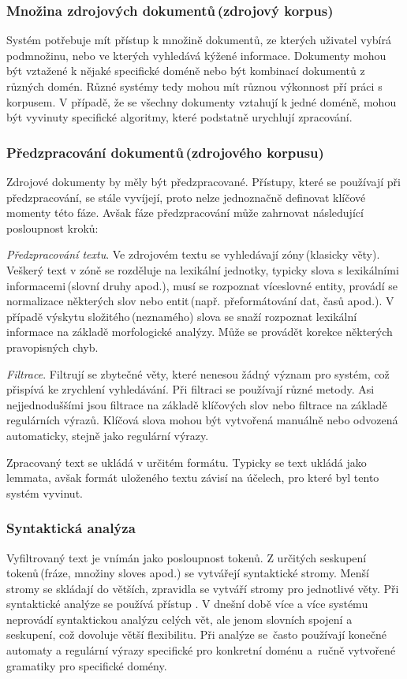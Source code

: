 \subsubsection*{Množina zdrojových dokumentů\,(zdrojový korpus)}
Systém potřebuje mít přístup k množině dokumentů, ze kterých uživatel vybírá podmnožinu, nebo ve kterých vyhledává kýžené informace. Dokumenty mohou být vztažené k nějaké specifické doméně nebo být kombinací dokumentů z různých domén.  Různé systémy tedy mohou mít různou výkonnost pří práci s korpusem. V případě, že se všechny dokumenty vztahují k jedné doméně, mohou být vyvinuty specifické algoritmy, které podstatně urychlují zpracování.  

\subsubsection*{Předzpracování dokumentů\,(zdrojového korpusu)}
Zdrojové dokumenty by měly být předzpracované. Přístupy, které se používají při předzpracování, se stále vyvíjejí, proto nelze jednoznačně definovat klíčové momenty této fáze. Avšak fáze předzpracování může zahrnovat následující posloupnost kroků:


\emph{Předzpracování textu}. Ve zdrojovém textu se vyhledávají zóny\,(klasicky věty). Veškerý text v zóně se rozděluje na lexikální jednotky, typicky slova s lexikálními informacemi\,(slovní druhy apod.),  musí se rozpoznat víceslovné entity, provádí se normalizace některých slov nebo entit\,(např. přeformátování dat, časů apod.). V případě výskytu složitého\,(neznamého) slova se snaží rozpoznat lexikální informace na základě morfologické analýzy. Může se provádět korekce některých pravopisných chyb. 

\emph{Filtrace}. Filtrují se zbytečné věty, které nenesou žádný význam pro systém, což přispívá ke zrychlení vyhledávání. Při filtraci se používají různé metody. Asi nejjednoduššími jsou filtrace na základě klíčových slov nebo filtrace na základě regulárních výrazů. Klíčová slova mohou být vytvořená manuálně nebo odvozená automaticky, stejně jako regulární výrazy.

Zpracovaný text se ukládá v určitém formátu. Typicky se text ukládá jako lemmata, avšak  formát uloženého textu závisí na účelech, pro které byl tento systém vyvinut.


\subsubsection{Syntaktická analýza}
Vyfiltrovaný text je vnímán jako posloupnost tokenů. Z určitých seskupení tokenů\,(fráze, množiny sloves apod.) se vytvářejí syntaktické stromy. Menší stromy se skládají do větších, zpravidla se vytváří stromy pro jednotlivé věty. Při syntaktické analýze se používá přístup . V dnešní době více a více systému neprovádí syntaktickou analýzu celých vět, ale jenom slovních spojení a seskupení, což dovoluje větší flexibilitu. Při analýze se~často používají konečné automaty a regulární výrazy specifické pro konkretní doménu a~ručně vytvořené gramatiky  pro specifické domény.

